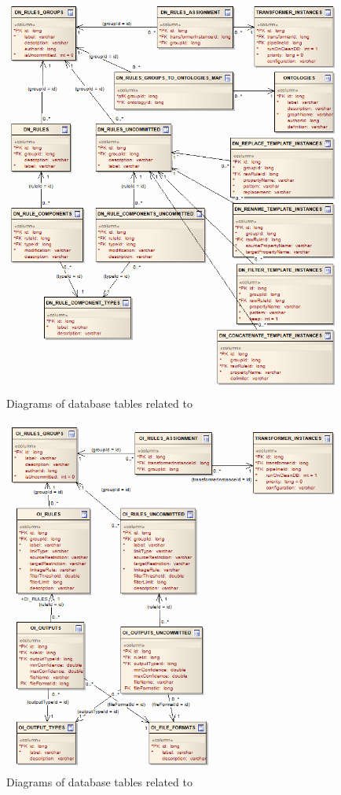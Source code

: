 \begin{description}[style=nextline,font=\ttfamily]
\begin{figure}[htbp]
    \centering
    \includegraphics[scale=0.6]{images/db-dn.png}
    \caption{Diagrams of database tables related to \DN}
	\label{fig:dbDN}
\end{figure}

\begin{figure}[htbp]
    \centering
    \includegraphics[scale=0.6]{images/db-oi.png}
    \caption{Diagrams of database tables related to \OI}
	\label{fig:dbOI}
\end{figure}


\end{description}
